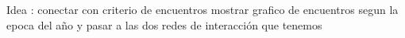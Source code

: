 \begin{Huge}
Idea : conectar con criterio de encuentros mostrar grafico de encuentros segun la epoca del año y pasar a las dos redes de interacción que tenemos 
\end{Huge}

